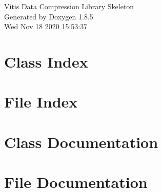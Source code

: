 \documentclass[twoside]{book}
\newcommand{\clearemptydoublepage}{%
  \newpage{\pagestyle{empty}\cleardoublepage}%
}
\begin{document}
\hypersetup{pageanchor=false}
\begin{titlepage}
\vspace*{7cm}
\begin{center}%
{\Large Vitis Data Compression Library Skeleton }\\
\vspace*{1cm}
{\large Generated by Doxygen 1.8.5}\\
\vspace*{0.5cm}
{\small Wed Nov 18 2020 15:53:37}\\
\end{center}
\end{titlepage}
\clearemptydoublepage
\tableofcontents
\clearemptydoublepage
{}
\hypersetup{pageanchor=true}

\chapter{Class Index}

\chapter{File Index}

\chapter{Class Documentation}






\chapter{File Documentation}


























\newpage
{}
{}
\printindex
\end{document}
